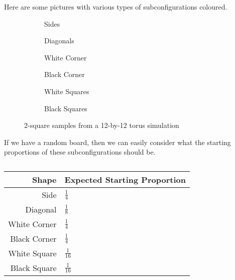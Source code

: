 \documentclass[12pt]{article}
\theoremstyle{definition}
\theoremstyle{remark}
\theoremstyle{remark}
\begin{document}
\par
Here are some pictures with various types of subconfigurations coloured.
\begin{figure}
  \centering
  \begin{subfigure}[b]{0.3\linewidth}
    \caption{Sides}
  \end{subfigure}
  \begin{subfigure}[b]{0.3\linewidth}
    \caption{Diagonals}
  \end{subfigure}
  \begin{subfigure}[b]{0.3\linewidth}
    \caption{White Corner}
  \end{subfigure}
  \begin{subfigure}[b]{0.3\linewidth}
    \caption{Black Corner}
  \end{subfigure}
  \begin{subfigure}[b]{0.3\linewidth}
    \caption{White Squares}
  \end{subfigure}
  \begin{subfigure}[b]{0.3\linewidth}
    \caption{Black Squares}
  \end{subfigure}
  \caption{2-square samples from a 12-by-12 torus simulation}
\end{figure}

\par
If we have a random board, then we can easily consider what the starting proportions of these subconfigurations should be. 
\begin{table}[H]
\label{InitPropsTable}
\begin{tabular}{r | l}
  Shape & Expected Starting Proportion \\ \hline
  Side & $\frac{1}{4}$ \\
  Diagonal & $\frac{1}{8}$ \\
  White Corner & $\frac{1}{4}$ \\
  Black Corner & $\frac{1}{4}$ \\
  White Square & $\frac{1}{16}$ \\
  Black Square & $\frac{1}{16}$ \\
\end{tabular}
\caption{}
\end{table}
\end{document}
